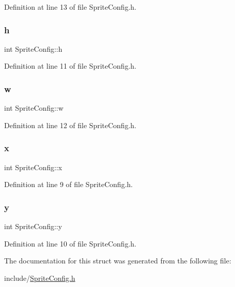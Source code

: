 Definition at line 13 of file Sprite\+Config.\+h.

\mbox{\label{struct_sprite_config_a88409cd34729d9d86faf6f89c83d1b30}} 
\subsubsection{\texorpdfstring{h}{h}}
{\footnotesize\ttfamily int Sprite\+Config\+::h}



Definition at line 11 of file Sprite\+Config.\+h.

\mbox{\label{struct_sprite_config_a5fa96384aee1bb0368f6e45f43ba8c20}} 
\subsubsection{\texorpdfstring{w}{w}}
{\footnotesize\ttfamily int Sprite\+Config\+::w}



Definition at line 12 of file Sprite\+Config.\+h.

\mbox{\label{struct_sprite_config_a14be384f5a3d4e341f25f39324085dc0}} 
\subsubsection{\texorpdfstring{x}{x}}
{\footnotesize\ttfamily int Sprite\+Config\+::x}



Definition at line 9 of file Sprite\+Config.\+h.

\mbox{\label{struct_sprite_config_af0995ec93785b40557108a845a03419e}} 
\subsubsection{\texorpdfstring{y}{y}}
{\footnotesize\ttfamily int Sprite\+Config\+::y}



Definition at line 10 of file Sprite\+Config.\+h.



The documentation for this struct was generated from the following file\+:\begin{DoxyCompactItemize}
\item 
include/\mbox{\hyperlink{_sprite_config_8h}{Sprite\+Config.\+h}}\end{DoxyCompactItemize}
